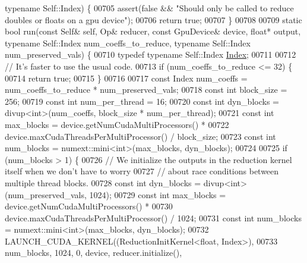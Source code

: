 \begin{DoxyCode}
{      typename} Self::Index) \{
00705     assert(\textcolor{keyword}{false} && \textcolor{stringliteral}{"Should only be called to reduce doubles or floats on a gpu device"});
00706     \textcolor{keywordflow}{return} \textcolor{keyword}{true};
00707   \}
00708 
00709   \textcolor{keyword}{static} \textcolor{keywordtype}{bool} run(\textcolor{keyword}{const} Self& \textcolor{keyword}{self}, Op& reducer, \textcolor{keyword}{const} GpuDevice& device, \textcolor{keywordtype}{float}* output, \textcolor{keyword}{typename} 
      Self::Index num\_coeffs\_to\_reduce, \textcolor{keyword}{typename} Self::Index num\_preserved\_vals) \{
00710     \textcolor{keyword}{typedef} \textcolor{keyword}{typename} Self::Index \hyperlink{namespace_eigen_a62e77e0933482dafde8fe197d9a2cfde}{Index};
00711 
00712     \textcolor{comment}{// It's faster to use the usual code.}
00713     \textcolor{keywordflow}{if} (num\_coeffs\_to\_reduce <= 32) \{
00714       \textcolor{keywordflow}{return} \textcolor{keyword}{true};
00715     \}
00716 
00717     \textcolor{keyword}{const} Index num\_coeffs = num\_coeffs\_to\_reduce * num\_preserved\_vals;
00718     \textcolor{keyword}{const} \textcolor{keywordtype}{int} block\_size = 256;
00719     \textcolor{keyword}{const} \textcolor{keywordtype}{int} num\_per\_thread = 16;
00720     \textcolor{keyword}{const} \textcolor{keywordtype}{int} dyn\_blocks = divup<int>(num\_coeffs, block\_size * num\_per\_thread);
00721     \textcolor{keyword}{const} \textcolor{keywordtype}{int} max\_blocks = device.getNumCudaMultiProcessors() *
00722                            device.maxCudaThreadsPerMultiProcessor() / block\_size;
00723     \textcolor{keyword}{const} \textcolor{keywordtype}{int} num\_blocks = numext::mini<int>(max\_blocks, dyn\_blocks);
00724 
00725     \textcolor{keywordflow}{if} (num\_blocks > 1) \{
00726       \textcolor{comment}{// We initialize the outputs in the reduction kernel itself when we don't have to worry}
00727       \textcolor{comment}{// about race conditions between multiple thread blocks.}
00728       \textcolor{keyword}{const} \textcolor{keywordtype}{int} dyn\_blocks = divup<int>(num\_preserved\_vals, 1024);
00729       \textcolor{keyword}{const} \textcolor{keywordtype}{int} max\_blocks = device.getNumCudaMultiProcessors() *
00730                              device.maxCudaThreadsPerMultiProcessor() / 1024;
00731       \textcolor{keyword}{const} \textcolor{keywordtype}{int} num\_blocks = numext::mini<int>(max\_blocks, dyn\_blocks);
00732       LAUNCH\_CUDA\_KERNEL((ReductionInitKernel<float, Index>),
00733                          num\_blocks, 1024, 0, device, reducer.initialize(),

\end{DoxyCode}
